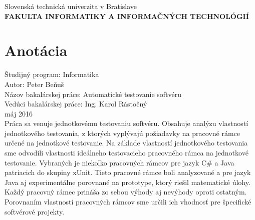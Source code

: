 \documentclass[11pt,twoside,slovak,a4paper]{article}
\begin{document}
	
	\begin{titlepage}
		\begin{center}
			\large 		Slovenská technická univerzita v Bratislave\\
			\textbf{\MakeUppercase{Fakulta informatiky a informačných technológií}}\\
			\hrulefill
		\end{center}
			\section*{Anotácia}
		Študijný program: Informatika\\
		Autor: Peter Beňuš\\
		Názov bakalárskej práce: Automatické testovanie softvéru \\
		Vedúci bakalárskej práce: Ing. Karol Rástočný\\
		máj 2016\\
		Práca sa venuje jednotkovému testovaniu softvéru. Obsahuje analýzu vlastností jednotkového testovania, z ktorých vyplývajú požiadavky na pracovné rámce určené na jednotkové testovanie. Na základe vlastností jednotkového testovania sme odvodili vlastnosti ideálneho testovacieho pracovného rámca na jednotkové testovanie. Vybraných je niekoľko pracovných rámcov pre jazyk C\# a Java patriacich do skupiny xUnit. Tieto pracovné rámce boli analyzované a pre jazyk Java aj experimentálne porovnané na prototype, ktorý riešil matematické úlohy. Každý pracovný rámec prináša zo sebou výhody aj nevýhody oproti ostatným. Porovnaním vlastností pracovných rámcov sme určili ich vhodnosť pre špecifické softvérové projekty.
	\end{titlepage}
	
\end{document}
